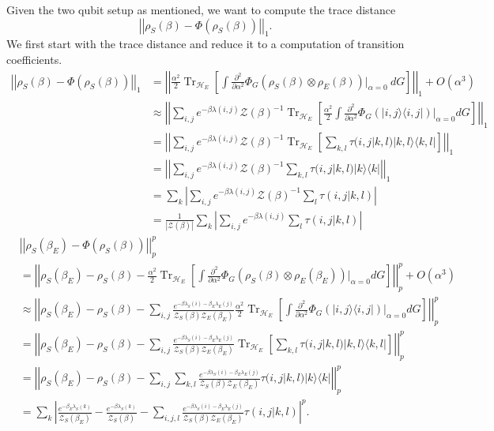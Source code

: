 \documentclass{article}
\newcommand{\ketbra}[2]{| #1\rangle\! \langle #2|}
\newcommand{\brackets}[1]{\left[ #1 \right]}
\newcommand{\abs}[1]{\left| #1 \right|}
\newcommand{\norm}[1]{\left| \left| #1 \right| \right|}
\newcommand{\bigo}[1]{O\left( #1 \right)}
\DeclareMathOperator{\Tr}{Tr}
\newcommand{\partrace}[2]{\Tr_{#1} \brackets{ #2 }}
\newcommand{\hilb}{\mathcal{H}}
\newcommand{\partfun}{\mathcal{Z}}
\begin{document}
Given the two qubit setup as mentioned, we want to compute the trace distance 
\begin{equation}
    \norm{\rho_S(\beta) - \Phi(\rho_S(\beta))}_1.
\end{equation}
We first start with the trace distance and reduce it to a computation of transition coefficients. 
\begin{align}
    \norm{\rho_S(\beta) - \Phi(\rho_S(\beta))}_1  &= \norm{\frac{\alpha^2}{2} \partrace{\hilb_E}{\int \frac{\partial^2}{\partial \alpha^2} \Phi_G(\rho_S(\beta) \otimes \rho_E(\beta)) \bigg|_{\alpha = 0} ~dG}}_1 + \bigo{\alpha^3} \\
    &\approx \norm{\sum_{i,j} e^{-\beta \lambda(i,j)} \partfun(\beta)^{-1}\partrace{\hilb_E}{ \frac{\alpha^2}{2} \int \frac{\partial^2}{\partial \alpha^2} \Phi_G(\ketbra{i,j}{i,j})\bigg|_{\alpha=0} dG} }_1 \\
    &= \norm{\sum_{i,j} e^{-\beta \lambda(i,j)} \partfun(\beta)^{-1} \partrace{\hilb_E}{\sum_{k,l} \tau(i,j | k,l) \ketbra{k,l}{k,l}}}_1 \\
    &= \norm{\sum_{i,j} e^{-\beta \lambda(i,j)} \partfun(\beta)^{-1} \sum_{k,l} \tau(i,j |k,l) \ketbra{k}{k}}_1 \\
    &= \sum_k \abs{\sum_{i,j} e^{-\beta \lambda(i,j)} \partfun(\beta)^{-1} \sum_{l} \tau(i,j |k,l)} \\
    &= \frac{1}{|\partfun(\beta)|} \sum_k \abs{\sum_{i,j} e^{-\beta \lambda(i,j)} \sum_{l} \tau(i,j |k,l)} \label{eq:fixed_point_as_transition_coeffs}
\end{align}
\begin{align}
&\norm{\rho_S(\beta_E) - \Phi(\rho_S(\beta))}_p^p \\
&= \norm{\rho_S(\beta_E) - \rho_S(\beta) - \frac{\alpha^2}{2} \partrace{\hilb_E}{\int \frac{\partial^2}{\partial \alpha^2} \Phi_G(\rho_S(\beta) \otimes \rho_E(\beta_E)) \bigg|_{\alpha=0} dG}}_p^p + \bigo{\alpha^3} \\
&\approx \norm{\rho_S(\beta_E) - \rho_S(\beta) - \sum_{i,j} \frac{e^{-\beta \lambda_S(i) -\beta_E \lambda_E(j)}}{\partfun_S(\beta) \partfun_E(\beta_E)} \frac{\alpha^2}{2}\partrace{\hilb_E}{\int \frac{\partial^2}{\partial \alpha^2} \Phi_G(\ketbra{i,j}{i,j}) \bigg|_{\alpha=0} dG} }_p^p \\
&= \norm{\rho_S(\beta_E) - \rho_S(\beta) - \sum_{i,j} \frac{e^{-\beta \lambda_S(i) -\beta_E \lambda_E(j)}}{\partfun_S(\beta) \partfun_E(\beta_E)} \partrace{\hilb_E}{\sum_{k,l} \tau(i,j|k,l) \ketbra{k,l}{k,l}} }_p^p \\
&= \norm{\rho_S(\beta_E) - \rho_S(\beta) - \sum_{i,j} \sum_{k,l} \frac{e^{-\beta \lambda_S(i) -\beta_E \lambda_E(j)}}{\partfun_S(\beta) \partfun_E(\beta_E)} \tau(i,j|k,l) \ketbra{k}{k} }_p^p \\
&= \sum_k \abs{\frac{e^{-\beta_E \lambda_S(k)}}{\partfun_S(\beta_E)} - \frac{e^{-\beta \lambda_S(k)}}{\partfun_S(\beta)} - \sum_{i,j,l} \frac{e^{-\beta \lambda_S(i) - \beta_E \lambda_E(j)}}{\partfun_S(\beta) \partfun_E(\beta_E)} \tau(i,j|k,l)}^p. \label{eq:trace_dist_p_norm}
\end{align}
\end{document}
